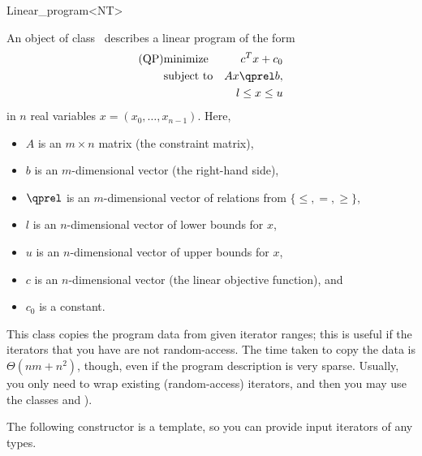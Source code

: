 \begin{ccRefClass}{Linear_program<NT>}


\ccDefinition
An object of class \ccRefName\ describes a linear program of the form
\begin{eqnarray*}
\mbox{(QP)}& \mbox{minimize} & c^{T}x+c_0 \\
&\mbox{subject to}   & Ax\qprel b, \\
&                    & l \leq x \leq u
\end{eqnarray*}
in $n$ real variables $x=(x_0,\ldots,x_{n-1})$.
Here, 
\begin{itemize}
\item $A$ is an $m\times n$ matrix (the constraint matrix), 
\item $b$ is an $m$-dimensional vector (the right-hand side),
\item $\qprel$ is an $m$-dimensional vector of relations 
from $\{\leq, =, \geq\}$, 
\item $l$ is an $n$-dimensional vector of lower
bounds for $x$,
\item $u$ is an $n$-dimensional vector of upper bounds for
$x$, 
\item $c$ is an $n$-dimensional vector (the linear objective
  function), and 
\item $c_0$ is a constant.
\end{itemize}

This class copies the program data from given iterator ranges; this
is useful if the iterators that you have are not random-access.
The time taken to copy the data is $\Theta(nm+n^2)$, though, even if 
the program description is very sparse. Usually, 
you only need to wrap existing (random-access) 
iterators, and then you may use the classes 
 and ).

\ccIsModel
{}

\ccCreation
\ccIndexClassCreation
{}

The following constructor is a template, so you can provide input
iterators of any types.


\ccSeeAlso
{}\\


\end{ccRefClass}
